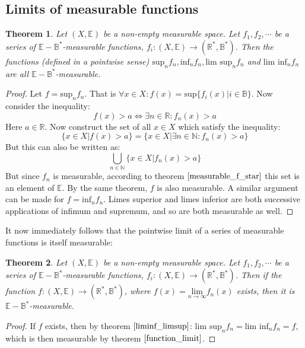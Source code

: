 \documentclass[12pt, a4paper]{article}
\newtheorem{theorem}{Theorem}[section]
\numberwithin{equation}{section}
\begin{document}
\subsection{Limits of measurable functions}
\begin{theorem}
\label{function_limit}
Let $(X,\mathbb{E})$ be a non-empty measurable space. Let $f_1,f_2,\cdots$ be a series of $\mathbb{E}-\mathbb{B}^*$-measurable functions, $f_i: (X,\mathbb{E})\rightarrow(\mathbb{R}^*,\mathbb{B}^*)$. Then the functions (defined in a pointwise sense) $\textrm{sup}_n f_n, \textrm{inf}_n f_n, \textrm{lim sup}_n f_n$ and $\textrm{lim inf}_n f_n$ are all $\mathbb{E}-\mathbb{B}^*$-measurable.
\end{theorem}
\begin{proof}
Let $f=\textrm{sup}_n f_n$. That is $\forall x\in X: f(x)=\textrm{sup}\{f_i(x)|i\in\mathbb{B}\}$. Now consider the inequality:
\begin{equation}
f(x)>a\Leftrightarrow\exists n\in\mathbb{R}: f_n(x)>a
\end{equation}
Here $a\in\mathbb{R}$. Now construct the set of all $x\in X$ which satisfy the inequality:
\begin{equation}
\{x\in X|f(x)>a\}=\{x\in X|\exists n\in\mathbb{N}: f_n(x)>a\}
\end{equation}
But this can also be written as:
\begin{equation}
\bigcup_{n\in\mathbb{N}}\{x\in X|f_n(x)>a\}
\end{equation}
But since $f_n$ is measurable, according to theorem $\ref{measurable_f_star}$ this set is an element of $\mathbb{E}$. By the same theorem, $f$ is also measurable. A similar argument can be made for $f=\textrm{inf}_n f_n$. Limes superior and limes inferior are both successive applications of infimum and supremum, and so are both measurable as well.
\end{proof}

It now immediately follows that the pointwise limit of a series of measurable functions is itself measurable:

\begin{theorem}
Let $(X,\mathbb{E})$ be a non-empty measurable space. Let $f_1,f_2,\cdots$ be a series of $\mathbb{E}-\mathbb{B}^*$-measurable functions, $f_i: (X,\mathbb{E})\rightarrow(\mathbb{R}^*,\mathbb{B}^*)$. Then if the function $f: (X,\mathbb{E})\rightarrow(\mathbb{R}^*,\mathbb{B}^*)$, where $f(x)=\underset{n\rightarrow\infty}{\textrm{lim}}f_n(x)$ exists, then it is $\mathbb{E}-\mathbb{B}^*$-measurable.
\end{theorem}
\begin{proof}
If $f$ exists, then by theorem $\ref{liminf_limsup}$: $\textrm{lim sup}_n f_n=\textrm{lim inf}_n f_n=f$, which is then measurable by theorem $\ref{function_limit}$.
\end{proof}
\end{document}
